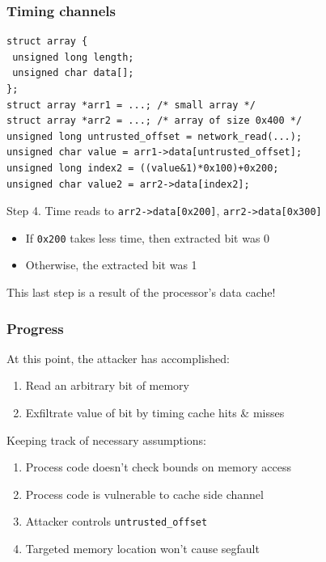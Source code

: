 \documentclass[10pt,handout]{beamer}
\begin{document}
\begin{frame}[fragile]

\frametitle{Timing channels}

\begin{lstlisting}[basicstyle=\small,style=customjava]
struct array {
 unsigned long length;
 unsigned char data[];
};
struct array *arr1 = ...; /* small array */
struct array *arr2 = ...; /* array of size 0x400 */
unsigned long untrusted_offset = network_read(...);
unsigned char value = arr1->data[untrusted_offset];
unsigned long index2 = ((value&1)*0x100)+0x200;
unsigned char value2 = arr2->data[index2];
\end{lstlisting}

\begin{center}
Step 4. Time reads to \texttt{arr2->data[0x200]}, \texttt{arr2->data[0x300]}
\pause
\begin{itemize}
\item If \texttt{0x200} takes less time, then extracted bit was 0
\item Otherwise, the extracted bit was 1 \\[1em]
\end{itemize}
\pause
This last step is a result of the processor's data cache!
\end{center}

\end{frame}


\begin{frame}

\frametitle{Progress}

At this point, the attacker has accomplished:
\begin{enumerate}
  \item Read an arbitrary bit of memory
  \item Exfiltrate value of bit by timing cache hits \& misses \\[1em]
\end{enumerate}\pause

Keeping track of necessary assumptions:
\begin{enumerate}
  \item Process code doesn't check bounds on memory access
  \item Process code is vulnerable to cache side channel
  \item Attacker controls \texttt{untrusted\_offset}
  \item Targeted memory location won't cause segfault
\end{enumerate}

\end{frame}
\end{document}

